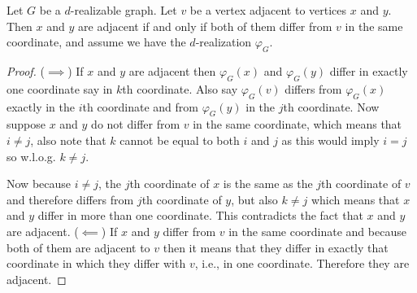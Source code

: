 \documentclass[12pt,a4paper,titlepage,openany]{report}
\begin{document}
\begin{lemma}\label{xyv adjacent}
Let $G$ be a $d$-realizable graph. Let $v$ be a vertex adjacent to vertices $x$ and $y$. Then $x$ and $y$ are adjacent if and only if both of them differ from $v$ in the same coordinate, and assume we have the $d$-realization $\varphi_G$.
\end{lemma}
\begin{proof}
($\implies$) If $x$ and $y$ are adjacent then $\varphi_G(x)$ and $\varphi_G(y)$ differ in exactly one coordinate say in $k$th coordinate. Also say $\varphi_G(v)$ differs from $\varphi_G(x)$ exactly in the $i$th coordinate and from $\varphi_G(y)$ in the $j$th coordinate. Now suppose $x$ and $y$ do not differ from $v$ in the same coordinate, which means that $i\neq j$, also note that $k$ cannot be equal to both $i$ and $j$ as this would imply $i=j$ so w.l.o.g. $k\neq j$. 

Now because $i\neq j$, the $j$th coordinate of $x$ is the same as the $j$th coordinate of $v$ and therefore differs from $j$th coordinate of $y$, but also $k\neq j$ which means that $x$ and $y$ differ in more than one coordinate. This contradicts the fact that $x$ and $y$ are adjacent.\newline
($\impliedby$) If $x$ and $y$ differ from $v$ in the same coordinate and because both of them are adjacent to $v$ then it means that they differ in exactly that coordinate in which they differ with $v$, i.e., in one coordinate. Therefore they are adjacent.
\end{proof}
\end{document}
